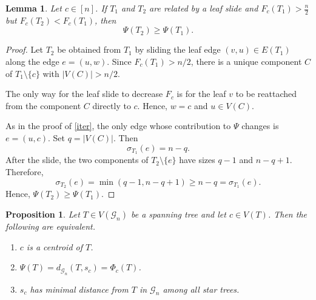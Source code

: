 \documentclass[reqno,dvipsnames]{amsart}
\theoremstyle{plain}
\newtheorem{lemma}[theorem]{Lemma}
\newtheorem{proposition}[theorem]{Proposition}
\numberwithin{equation}{section}
\theoremstyle{definition}
\begin{document}
\begin{lemma}\label{auxiliary}
	Let $c\in [n]$. If $T_1$ and $T_2$ are related by a leaf slide and
	$F_c(T_1)>\frac{n}{2}$ but $F_c(T_2)< F_c(T_1)$, then
	\[
	    \Psi(T_2) \geq \Psi(T_1).
	\]
\end{lemma}

\begin{proof}
	Let $T_2$ be obtained from $T_1$ by sliding the leaf edge
	$(v,u)\in E(T_1)$ along the edge $e=(u,w)$. Since
	$F_c(T_1)>n/2$, there is a unique component $C$ of
	$T_1\setminus\{c\}$ with $|V(C)|>n/2$.

	The only way for the leaf slide to decrease $F_c$ is for the leaf
	$v$ to be reattached from the component $C$ directly to $c$. Hence,
	$w=c$ and $u\in V(C)$.

	As in the proof of \autoref{iter}, the only edge whose contribution
	to $\Psi$ changes is $e=(u,c)$. Set $q=|V(C)|$. Then
	\[
	    \sigma_{T_1}(e)=n-q.
	\]
	After the slide, the two components of $T_2\setminus\{e\}$ have
	sizes $q-1$ and $n-q+1$. Therefore,
	\[
	    \sigma_{T_2}(e)=\min(q-1,n-q+1)\geq n-q=\sigma_{T_1}(e).
	\]
	Hence, $\Psi(T_2)\geq \Psi(T_1)$.
\end{proof}

\begin{proposition}\label{centraleq}
    Let $T\in V(\mathcal{G}_n)$ be a spanning tree and let $c\in V(T)$. Then the following are equivalent.
	\begin{enumerate}
		\item $c$ is a centroid of $T$. \label{central}
		\item $\Psi(T) = d_{\mathcal{G}_n}(T, s_c) = \Phi_c(T)$. \label{equalities}
		\item $s_c$ has minimal distance from $T$ in $\mathcal{G}_n$ among all star trees. \label{minstar}
	\end{enumerate}
\end{proposition}
\end{document}
